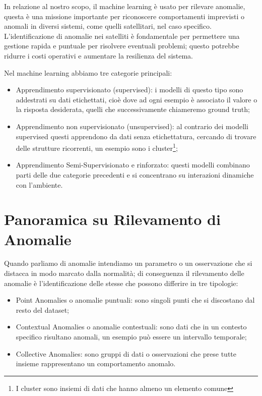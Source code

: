 In relazione al nostro scopo, il machine learning è usato per rilevare anomalie, questa è una missione importante per riconoscere comportamenti imprevisti o anomali in diversi sistemi, come quelli satellitari, nel caso specifico.
L'identificazione di anomalie nei satelliti è fondamentale per permettere una gestione rapida e puntuale per risolvere eventuali problemi; questo potrebbe ridurre i costi operativi e aumentare la resilienza del sistema.

Nel machine learning abbiamo tre categorie principali:
\begin{itemize}
    \item Apprendimento supervisionato (supervised): i modelli di questo tipo sono addestrati su dati etichettati, cioè dove ad ogni esempio è associato il valore o la risposta desiderata, quelli che successivamente chiameremo ground truth;
    \item Apprendimento non supervisionato (unsupervised): al contrario dei modelli supervised questi apprendono da dati senza etichettatura, cercando di trovare delle strutture ricorrenti, un esempio sono i cluster\footnote{I cluster sono insiemi di dati che hanno almeno un elemento comune};
    \item Apprendimento Semi-Supervisionato e rinforzato: questi modelli combinano parti delle due categorie precedenti e si concentrano su interazioni dinamiche con l'ambiente.
\end{itemize}
\pagebreak

\section{Panoramica su Rilevamento di Anomalie}
Quando parliamo di anomalie intendiamo un parametro o un osservazione che si distacca in modo marcato dalla normalità; di conseguenza il rilevamento delle anomalie è l'identificazione delle stesse che possono differire in tre tipologie:
\begin{itemize}
    \item Point Anomalies o anomalie puntuali: sono singoli punti che si discostano dal resto del dataset;
    \item Contextual Anomalies o anomalie contestuali: sono dati che in un contesto specifico risultano anomali, un esempio può essere un intervallo temporale;
    \item Collective Anomalies: sono gruppi di dati o osservazioni che prese tutte insieme rappresentano un comportamento anomalo.
\end{itemize}

